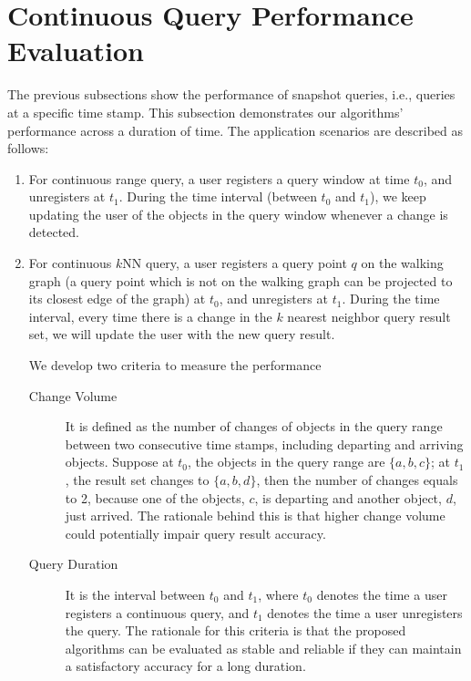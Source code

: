 \documentclass[12pt]{report}
\begin{document}
\section{Continuous Query Performance Evaluation}
\label{sec:orgb83268c}

The previous subsections show the performance of snapshot queries,
i.e., queries at a specific time stamp.  This subsection
demonstrates our algorithms' performance across a duration of
time.  The application scenarios are described as follows:

\begin{enumerate}
\item For continuous range query, a user registers a query window at
time \(t_0\), and unregisters at \(t_1\).  During the time
interval (between \(t_0\) and \(t_1\)), we keep updating the
user of the objects in the query window whenever a change is
detected.
\item For continuous \(k\)NN query, a user registers a query point
\(q\) on the walking graph (a query point which is not on the
walking graph can be projected to its closest edge of the
graph) at \(t_0\), and unregisters at \(t_1\).  During the time
interval, every time there is a change in the \(k\) nearest
neighbor query result set, we will update the user with the new
query result.

We develop two criteria to measure the performance
\begin{description}
\item[{Change Volume}] It is defined as the number of changes of
objects in the query range between two consecutive time
stamps, including departing and arriving objects. Suppose at
\(t_0\), the objects in the query range are \(\{a, b, c\}\);
at \(t_1\), the result set changes to \(\{a, b, d\}\), then
the number of changes equals to 2, because one of the
objects, \(c\), is departing and another object, \(d\), just
arrived.  The rationale behind this is that higher change
volume could potentially impair query result accuracy.
\item[{Query Duration}] It is the interval between \(t_0\) and
\(t_1\), where \(t_0\) denotes the time a user registers a
continuous query, and \(t_1\) denotes the time a user
unregisters the query.  The rationale for this criteria is
that the proposed algorithms can be evaluated as stable and
reliable if they can maintain a satisfactory accuracy for a
long duration.
\end{description}
\end{enumerate}
\end{document}
